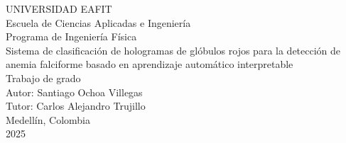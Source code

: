 \begin{titlepage}
    \centering
    {\Large UNIVERSIDAD EAFIT\\}
    {\large Escuela de Ciencias Aplicadas e Ingeniería\\}
    {\large Programa de Ingeniería Física\\[1.5cm]}
    {\Large Sistema de clasificación de hologramas de glóbulos rojos para la detección de anemia falciforme basado en aprendizaje automático interpretable\\[1.5cm]}
    {\large Trabajo de grado\\[0.5cm]}
    {\large Autor: Santiago Ochoa Villegas\\}
    {\large Tutor: Carlos Alejandro Trujillo\\[1.5cm]}
    {\large Medellín, Colombia\\}
    {\large 2025\\}
\end{titlepage}
\cleardoublepage
